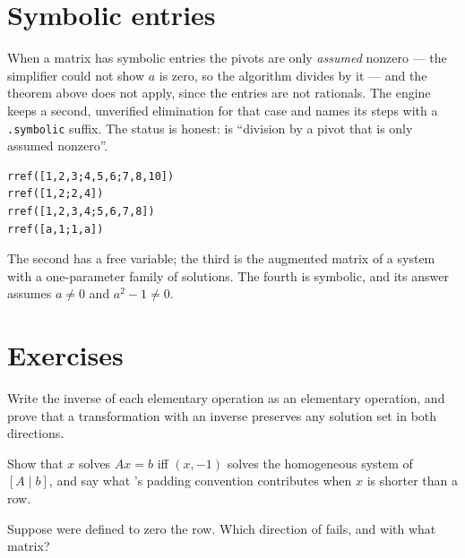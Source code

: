 \section{Symbolic entries}

When a matrix has symbolic entries the pivots are only \emph{assumed} nonzero --- the simplifier
could not show $a$ is zero, so the algorithm divides by it --- and the theorem above does not
apply, since the entries are not rationals. The engine keeps a second, unverified elimination for
that case and names its steps with a \texttt{.symbolic} suffix. The status is honest:
 is ``division by a pivot that is only assumed nonzero''.

\begin{trybox}
\begin{verbatim}
rref([1,2,3;4,5,6;7,8,10])
rref([1,2;2,4])
rref([1,2,3,4;5,6,7,8])
rref([a,1;1,a])
\end{verbatim}
  The second has a free variable; the third is the augmented matrix of a system with a
  one-parameter family of solutions. The fourth is symbolic, and its answer assumes
  $a \neq 0$ and $a^2 - 1 \neq 0$.
\end{trybox}

\section{Exercises}

\begin{exercisebox}[Invertibility]
  Write the inverse of each elementary operation as an elementary operation, and prove that a
  transformation with an inverse preserves any solution set in both directions.
\end{exercisebox}

\begin{exercisebox}
  Show that $x$ solves $Ax = b$ iff $(x, -1)$ solves the homogeneous system of $[A \mid b]$, and
  say what 's padding convention contributes when $x$ is shorter than a row.
\end{exercisebox}

\begin{exercisebox}
  Suppose  were defined to zero the row. Which direction of 
  fails, and with what matrix?
\end{exercisebox}
